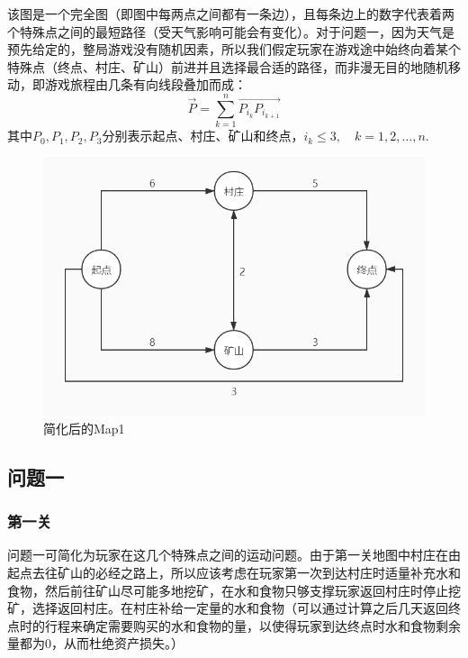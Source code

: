 \documentclass[withoutpre]{cumcmthesis} %
\begin{document}
该图是一个完全图（即图中每两点之间都有一条边），且每条边上的数字代表着两个特殊点之间的最短路径（受天气影响可能会有变化）。对于问题一，因为天气是预先给定的，整局游戏没有随机因素，所以我们假定玩家在游戏途中始终向着某个特殊点（终点、村庄、矿山）前进并且选择最合适的路径，而非漫无目的地随机移动，即游戏旅程由几条有向线段叠加而成：
\begin{equation}
	\overrightarrow{P}=\sum_{k=1}^{n}\overrightarrow{P_{i_k}P_{i_{k+1}}}
\end{equation}
其中$P_0,P_1,P_2,P_3$分别表示起点、村庄、矿山和终点，$i_k\leqslant3,\quad k=1,2,\dots,n$.
\begin{figure}[H]
	\centering
	\includegraphics[scale=0.4]{figures/map1newer.jpg}
	\caption{简化后的Map1}
	\label{fig:map1}
\end{figure}

\subsection{问题一}

\subsubsection{第一关}
问题一可简化为玩家在这几个特殊点之间的运动问题。由于第一关地图中村庄在由起点去往矿山的必经之路上，所以应该考虑在玩家第一次到达村庄时适量补充水和食物，然后前往矿山尽可能多地挖矿，在水和食物只够支撑玩家返回村庄时停止挖矿，选择返回村庄。在村庄补给一定量的水和食物（可以通过计算之后几天返回终点时的行程来确定需要购买的水和食物的量，以使得玩家到达终点时水和食物剩余量都为0，从而杜绝资产损失。）
\end{document}
